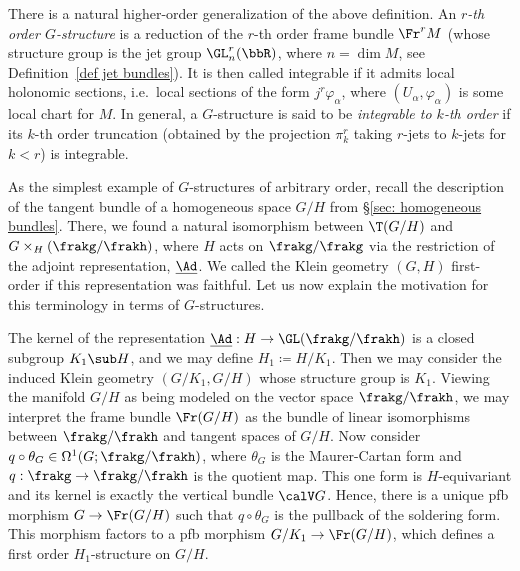 \begin{rem}
    There is a natural higher-order generalization of the above definition. An \emph{$r$-th order $G$-structure} is a reduction of the $r$-th order frame bundle $\Fr^r M$ (whose structure group is the jet group $\GL^r_n(\bbR)$, where $n=\dim M$, see Definition~\ref{def jet bundles}). It is then called integrable if it admits local holonomic sections, i.e.\ local sections of the form $j^r \varphi_\alpha$, where $(U_\alpha,\varphi_\alpha)$ is some local chart for $M$. In general, a $G$-structure is said to be \emph{integrable to $k$-th order} if its $k$-th order truncation (obtained by the projection $\pi^r_k$ taking $r$-jets to $k$-jets for $k<r$) is integrable.
\end{rem}

\begin{rem}\label{rem higher order Klein geometry}
    As the simplest example of $G$-structures of arbitrary order, recall the description of the tangent bundle of a homogeneous space $G\slash H$ from \S\ref{sec: homogeneous bundles}. There, we found a natural isomorphism between $\T(G\slash H)$ and $G\times_H (\frakg\slash\frakh)$, where $H$ acts on $\frakg\slash\frakg$ via the restriction of the adjoint representation,  $\underline{\Ad}$. We called the Klein geometry $(G,H)$ first-order if this representation was faithful. Let us now explain the motivation for this terminology in terms of $G$-structures.

    The kernel of the representation $\underline{\Ad}:H\to \GL(\frakg\slash\frakh)$ is a closed subgroup $K_1\sub H$, and we may define $H_1\coloneqq H\slash K_1$. Then we may consider the induced Klein geometry $(G\slash K_1,G\slash H)$ whose structure group is $K_1$. Viewing the manifold $G\slash H$ as being modeled on the vector space $\frakg\slash\frakh$, we may interpret the frame bundle $\Fr (G\slash H)$ as the bundle of linear isomorphisms between $\frakg\slash\frakh$ and tangent spaces of $G\slash H$. Now consider $q\circ \theta_G\in \Omega^1(G;\frakg\slash\frakh)$, where $\theta_G$ is the Maurer-Cartan form and $q:\frakg\to\frakg\slash\frakh$ is the quotient map. This one form is $H$-equivariant and its kernel is exactly the vertical bundle $\calV G$. Hence, there is a unique \gls{pfb} morphism $G\to \Fr(G\slash H)$ such that $q\circ \theta_G$ is the pullback of the soldering form. This morphism factors to a \gls{pfb} morphism $G\slash K_1\to \Fr(G\slash H)$, which defines a first order $H_1$-structure on $G\slash H$.


\end{rem}

